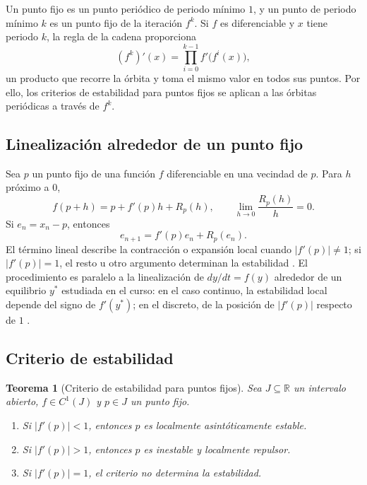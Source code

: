\documentclass[11pt,letterpaper]{article}
\newtheorem{teorema}{Teorema}[section]
\theoremstyle{definition}
\theoremstyle{remark}
\begin{document}
Un punto fijo es un punto periódico de periodo mínimo \(1\), y un punto de periodo mínimo \(k\) es un punto fijo de la iteración \(f^k\). Si \(f\) es diferenciable y \(x\) tiene periodo \(k\), la regla de la cadena proporciona
\[
(f^k)'(x)=\prod_{i=0}^{k-1}f'\bigl(f^i(x)\bigr),
\]
un producto que recorre la órbita y toma el mismo valor en todos sus puntos. Por ello, los criterios de estabilidad para puntos fijos se aplican a las órbitas periódicas a través de \(f^k\).

\subsection{Linealización alrededor de un punto fijo}

Sea \(p\) un punto fijo de una función \(f\) diferenciable en una vecindad de \(p\). Para \(h\) próximo a \(0\),
\[
f(p+h)=p+f'(p)h+R_p(h),
\qquad
\lim_{h\to0}\frac{R_p(h)}{h}=0.
\]
Si \(e_n=x_n-p\), entonces
\[
e_{n+1}=f'(p)e_n+R_p(e_n).
\]
El término lineal describe la contracción o expansión local cuando \(\lvert f'(p)\rvert\neq1\); si \(\lvert f'(p)\rvert=1\), el resto u otro argumento determinan la estabilidad \cite{Devaney1989}. El procedimiento es paralelo a la linealización de \(dy/dt=f(y)\) alrededor de un equilibrio \(y^*\) estudiada en el curso: en el caso continuo, la estabilidad local depende del signo de \(f'(y^*)\); en el discreto, de la posición de \(\lvert f'(p)\rvert\) respecto de \(1\) \cite{ApuntesMM1_2026}.

\subsection{Criterio de estabilidad}

\begin{teorema}[Criterio de estabilidad para puntos fijos]
\label{teo:estabilidad-punto-fijo}
Sea \(J\subseteq\mathbb R\) un intervalo abierto, \(f\in C^1(J)\) y \(p\in J\) un punto fijo.

\begin{enumerate}
    \item Si \(\lvert f'(p)\rvert<1\), entonces \(p\) es localmente asintóticamente estable.
    \item Si \(\lvert f'(p)\rvert>1\), entonces \(p\) es inestable y localmente repulsor.
    \item Si \(\lvert f'(p)\rvert=1\), el criterio no determina la estabilidad.
\end{enumerate}
\end{teorema}
\end{document}

